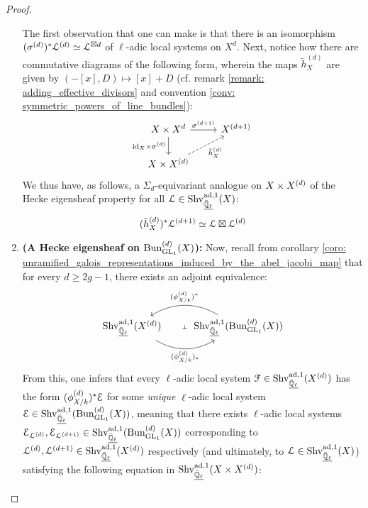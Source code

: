 \begin{proof}
\begin{enumerate}
                        The first observation that one can make is that there is an isomorphism $(\sigma^{(d)})^*\mathcal{L}^{(d)} \simeq \mathcal{L}^{\boxtimes d}$ of $\ell$-adic local systems on $X^d$. Next, notice how there are commutative diagrams of the following form, wherein the maps $\tilde{h}_X^{(d)}$ are given by $(-[x], D) \mapsto [x] + D$ (cf. remark \ref{remark: adding_effective_divisors} and convention \ref{conv: symmetric_powers_of_line_bundles}):
                            $$
                                \begin{tikzcd}
                                	{X \x X^d} & {X^{(d + 1)}} \\
                                	{X \x X^{(d)}}
                                	\arrow["{\id_X \x \sigma^{(d)}}"', from=1-1, to=2-1]
                                	\arrow["{\tilde{h}_X^{(d)}}"', dashed, from=2-1, to=1-2]
                                	\arrow["{\sigma^{(d + 1)}}", from=1-1, to=1-2]
                                \end{tikzcd}
                            $$
                        We thus have, as follows, a $\Sigma_d$-equivariant analogue on $X \x X^{(d)}$ of the Hecke eigensheaf property for all $\mathcal{L} \in \mathrm{Shv}_{\underline{\bar{\mathbb{Q}}_{\ell}}}^{\mathrm{ad}, 1}(X)$:
                            $$(\tilde{h}_X^{(d)})^* \mathcal{L}^{(d + 1)} \simeq \mathcal{L} \boxtimes \mathcal{L}^{(d)}$$
                        \item \textbf{(A Hecke eigensheaf on $\mathrm{Bun}_{\operatorname{GL}_1}^{(d)}(X)$):} Now, recall from corollary \ref{coro: unramified_galois_representations_induced_by_the_abel_jacobi_map} that for every $d \geq 2g - 1$, there exists an adjoint equivalence:
                            $$
                                \begin{tikzcd}
                                	{\Shv_{\underline{\bar{\Q}_{\ell}}}^{\ad, 1}(X^{(d)})} & {\Shv_{\underline{\bar{\Q}_{\ell}}}^{\ad, 1}(\Bun_{\GL_1}^{(d)}(X))}
                                	\arrow[""{name=0, anchor=center, inner sep=0}, "{(\AJ_{X/k}^{(d)})_*}"', bend right, from=1-1, to=1-2]
                                	\arrow[""{name=1, anchor=center, inner sep=0}, "{(\AJ_{X/k}^{(d)})^*}"', bend right, from=1-2, to=1-1]
                                	\arrow["\dashv"{anchor=center, rotate=-90}, draw=none, from=1, to=0]
                                \end{tikzcd}
                            $$ 
                        From this, one infers that every $\ell$-adic local system $\mathcal{F} \in \mathrm{Shv}_{\underline{\bar{\mathbb{Q}}_{\ell}}}^{\mathrm{ad}, 1}(X^{(d)})$ has the form $(\phi_{X/k}^{(d)})^* \mathcal{E}$ for some \textit{unique} $\ell$-adic local system $\mathcal{E} \in \mathrm{Shv}_{\underline{\bar{\mathbb{Q}}_{\ell}}}^{\mathrm{ad}, 1}(\mathrm{Bun}_{\operatorname{GL}_1}^{(d)}(X))$, meaning that there exists $\ell$-adic local systems $\mathcal{E}_{\mathcal{L}^{(d)}}, \mathcal{E}_{\mathcal{L}^{(d + 1)}} \in \mathrm{Shv}_{\underline{\bar{\mathbb{Q}}_{\ell}}}^{\mathrm{ad}, 1}(\mathrm{Bun}_{\operatorname{GL}_1}^{(d)}(X))$ corresponding to $\mathcal{L}^{(d)}, \mathcal{L}^{(d + 1)} \in \mathrm{Shv}_{\underline{\bar{\mathbb{Q}}_{\ell}}}^{\mathrm{ad}, 1}(X^{(d)})$ respectively (and ultimately, to $\mathcal{L} \in \mathrm{Shv}_{\underline{\bar{\mathbb{Q}}_{\ell}}}^{\mathrm{ad}, 1}(X)$) satisfying the following equation in $\Shv_{\underline{\bar{\Q}_{\ell}}}^{\ad, 1}(X \x X^{(d)})$:

\end{enumerate}
\end{proof}
